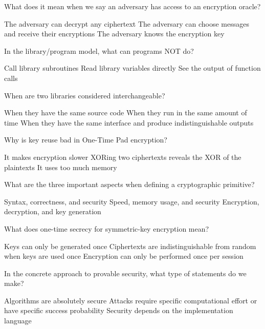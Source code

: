 \documentclass[10pt,a4paper,american]{exam}
\begin{document}
\begin{questions}
	\question What does it mean when we say an adversary has access to an encryption oracle?
	\begin{randomizechoices}
		\choice The adversary can decrypt any ciphertext
		\CorrectChoice The adversary can choose messages and receive their encryptions
		\choice The adversary knows the encryption key
	\end{randomizechoices}

	\question In the library/program model, what can programs NOT do?
	\begin{randomizechoices}
		\choice Call library subroutines
		\CorrectChoice Read library variables directly
		\choice See the output of function calls
	\end{randomizechoices}

	\question When are two libraries considered interchangeable?
	\begin{randomizechoices}
		\choice When they have the same source code
		\choice When they run in the same amount of time
		\CorrectChoice When they have the same interface and produce indistinguishable outputs
	\end{randomizechoices}

	\question Why is key reuse bad in One-Time Pad encryption?
	\begin{randomizechoices}
		\choice It makes encryption slower
		\CorrectChoice XORing two ciphertexts reveals the XOR of the plaintexts
		\choice It uses too much memory
	\end{randomizechoices}

	\question What are the three important aspects when defining a cryptographic primitive?
	\begin{randomizechoices}
		\CorrectChoice Syntax, correctness, and security
		\choice Speed, memory usage, and security
		\choice Encryption, decryption, and key generation
	\end{randomizechoices}

	\question What does one-time secrecy for symmetric-key encryption mean?
	\begin{randomizechoices}
		\choice Keys can only be generated once
		\CorrectChoice Ciphertexts are indistinguishable from random when keys are used once
		\choice Encryption can only be performed once per session
	\end{randomizechoices}

	\question In the concrete approach to provable security, what type of statements do we make?
	\begin{randomizechoices}
		\choice Algorithms are absolutely secure
		\CorrectChoice Attacks require specific computational effort or have specific success probability
		\choice Security depends on the implementation language
	\end{randomizechoices}


\end{questions}
\end{document}
